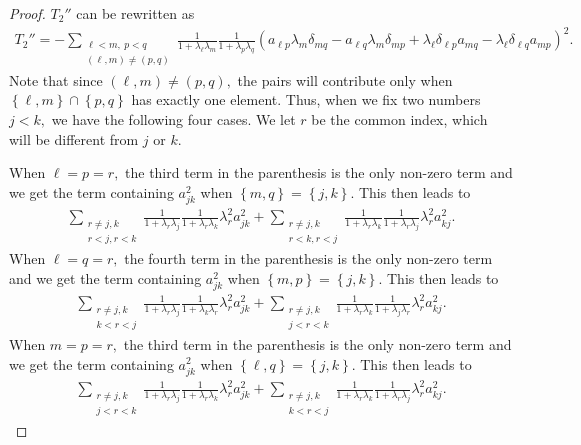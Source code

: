 \documentclass[11pt]{amsart}
\numberwithin{equation}{section}
\theoremstyle{definition}
\theoremstyle{definition}
\newcommand{\set}[1]{\left\{#1\right\}}
\newcommand{\pr}[1]{\left(#1\right)}
\begin{document}
\begin{proof}
	
	$T_2''$ can be rewritten as
	\begin{align*}
	T_2''
	=
	-\sum_{\substack{\ell<m,\ p<q\\(\ell,m)\neq (p,q)}}
	\frac 1{1+\lambda_\ell\lambda_m}
	\frac 1{1+\lambda_p\lambda_q}
	\pr{
		a_{\ell p}\lambda_m\delta_{mq}
		- a_{\ell q}\lambda_m\delta_{mp}
		+ \lambda_\ell\delta_{\ell p}a_{mq}
		- \lambda_\ell\delta_{\ell q}a_{mp}
	}^2.	
	\end{align*}
	Note that since $(\ell,m)\neq (p,q),$ the pairs will contribute only when $\set{\ell,m}\cap \set{p,q}$ has exactly one element.
	Thus, when we fix two numbers $j<k,$ we have the following four cases.
	We let $r$ be the common index, which will be different from $j$ or $k.$
	
	When $\ell=p=r,$ the third term in the parenthesis is the only non-zero term and we get the term containing $a_{jk}^2$ when $\set{m,q}=\set{j,k}.$
	This then leads to
	\begin{align}\label{T2-1}
	\sum_{\substack{r\neq j,k\\r<j,r<k}}
	\frac 1{1+\lambda_r\lambda_j}
	\frac 1{1+\lambda_r\lambda_k}
	\lambda_r^2 a_{jk}^2
	+ \sum_{\substack{r\neq j,k\\r<k,r<j}}
	\frac 1{1+\lambda_r\lambda_k}
	\frac 1{1+\lambda_r\lambda_j}
	\lambda_r^2 a_{kj}^2.
	\end{align}
	When $\ell=q=r,$ the fourth term in the parenthesis is the only non-zero term and we get the term containing $a_{jk}^2$ when $\set{m,p}=\set{j,k}.$
	This then leads to
	\begin{align}\label{T2-2}
	\sum_{\substack{r\neq j,k\\k<r<j}}
	\frac 1{1+\lambda_r\lambda_j}
	\frac 1{1+\lambda_k\lambda_r}
	\lambda_r^2 a_{jk}^2
	+ \sum_{\substack{r\neq j,k\\j<r<k}}
	\frac 1{1+\lambda_r\lambda_k}
	\frac 1{1+\lambda_j\lambda_r}
	\lambda_r^2 a_{kj}^2.
	\end{align}
	When $m=p=r,$ the third term in the parenthesis is the only non-zero term and we get the term containing $a_{jk}^2$ when $\set{\ell,q}=\set{j,k}.$
	This then leads to
	\begin{align}\label{T2-3}
	\sum_{\substack{r\neq j,k\\j<r<k}}
	\frac 1{1+\lambda_r\lambda_j}
	\frac 1{1+\lambda_r\lambda_k}
	\lambda_r^2 a_{jk}^2
	+ \sum_{\substack{r\neq j,k\\k<r<j}}
	\frac 1{1+\lambda_r\lambda_k}
	\frac 1{1+\lambda_r\lambda_j}
	\lambda_r^2 a_{kj}^2.
	\end{align}

\end{proof}
\end{document}
